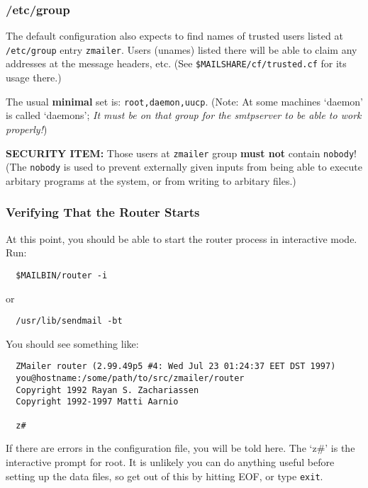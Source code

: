 \subsubsection{/etc/group}%
%

The default configuration also expects to find names of trusted users
listed at  {\tt /etc/group} entry {\tt zmailer}.  Users (unames) listed there
will be able to claim any addresses at the message headers, etc.
(See {\tt \$MAILSHARE/cf/trusted.cf} for its usage there.)

The usual {\bf minimal} set is: {\tt root,daemon,uucp}.
(Note: At some machines `daemon' is called `daemons';  {\em It must be
 on that group for the smtpserver to be able to work properly!})

{\bf SECURITY ITEM:} Those users at {\tt zmailer} group {\bf must not} contain {\tt nobody}!
(The {\tt nobody} is used to prevent externally given inputs from being
able to execute arbitary programs at the system, or from writing to
arbitary files.)




\subsubsection{Verifying That the Router Starts}%
%

At this point, you should be able to start the router process in
interactive mode.  Run:
\begin{verbatim}
  $MAILBIN/router -i
\end{verbatim}
or
\begin{verbatim}
  /usr/lib/sendmail -bt
\end{verbatim}

You should see something like:
\begin{verbatim}
  ZMailer router (2.99.49p5 #4: Wed Jul 23 01:24:37 EET DST 1997)
  you@hostname:/some/path/to/src/zmailer/router
  Copyright 1992 Rayan S. Zachariassen
  Copyright 1992-1997 Matti Aarnio
  
  z#    
\end{verbatim}

If there are errors in the configuration file, you will be told here.
The `z\#' is the interactive prompt for root. It is unlikely you can do anything useful 
before setting up the data files, so get out of this by hitting EOF, or type {\tt exit}.




